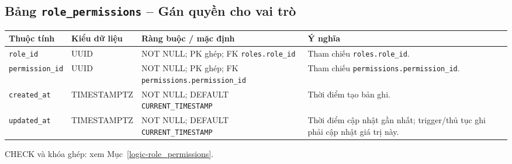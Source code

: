\subsection{Bảng \texttt{role\_\allowbreak{}permissions} -- Gán quyền cho vai trò}
\label{dictionary-role_permissions}
\begingroup
\footnotesize
\setlength{\tabcolsep}{3pt}
\begin{longtable}{>{\raggedright\arraybackslash}p{3.1cm}>{\raggedright\arraybackslash}p{2.5cm}>{\raggedright\arraybackslash}p{3.7cm}>{\raggedright\arraybackslash}p{4.3cm}}
\toprule
Thuộc tính & Kiểu dữ liệu & Ràng buộc / mặc định & Ý nghĩa \\
\midrule
\endhead
\texttt{role\_\allowbreak{}id} & UUID & NOT NULL; PK ghép; FK \texttt{roles.role\_\allowbreak{}id} & Tham chiếu \texttt{roles.role\_\allowbreak{}id}. \\
\texttt{permission\_\allowbreak{}id} & UUID & NOT NULL; PK ghép; FK \texttt{permissions.permission\_\allowbreak{}id} & Tham chiếu \texttt{permissions.permission\_\allowbreak{}id}. \\
\texttt{created\_\allowbreak{}at} & TIMESTAMPTZ & NOT NULL; DEFAULT \texttt{CURRENT\_\allowbreak{}TIMESTAMP} & Thời điểm tạo bản ghi. \\
\texttt{updated\_\allowbreak{}at} & TIMESTAMPTZ & NOT NULL; DEFAULT \texttt{CURRENT\_\allowbreak{}TIMESTAMP} & Thời điểm cập nhật gần nhất; trigger/thủ tục ghi phải cập nhật giá trị này. \\
\bottomrule
\end{longtable}
\endgroup
CHECK và khóa ghép: xem Mục~\ref{logic-role_permissions}.
